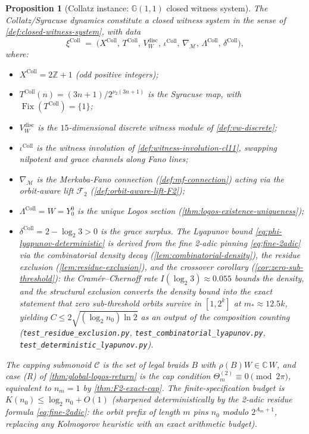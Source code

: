 \documentclass[11pt,a4paper]{article}
\theoremstyle{plain}
\newtheorem{proposition}[theorem]{Proposition}
\theoremstyle{definition}
\theoremstyle{remark}
\numberwithin{equation}{section}
\newcommand{\Cl}{\mathbb{G}}
\newcommand{\Complex}{\mathbb{C}}
\newcommand{\Z}{\mathbb{Z}}
\DeclareMathOperator{\Fix}{Fix}
\begin{document}
\begin{proposition}[Collatz instance: $\Cl(1,1)$ closed witness system]
\label{prop:collatz-closed-witness-system}
The Collatz/Syracuse dynamics constitute a closed witness system
in the sense of \cref{def:closed-witness-system}, with data
\[
  \xi^{\text{Coll}}\;=\;\bigl(
    X^{\text{Coll}},\,T^{\text{Coll}},\,V_W^{\mathrm{disc}},\,
    \iota^{\text{Coll}},\,\nabla_{\mathcal{M}},\,
    \Lambda^{\text{Coll}},\,\delta^{\text{Coll}}
  \bigr),
\]
where:
\begin{itemize}
  \item $X^{\text{Coll}}=2\Z+1$ (odd positive integers);
  \item $T^{\text{Coll}}(n)=(3n+1)/2^{\nu_2(3n+1)}$ is the
        Syracuse map, with $\Fix(T^{\text{Coll}})=\{1\}$;
  \item $V_W^{\mathrm{disc}}$ is the $15$-dimensional discrete
        witness module of \cref{def:vw-discrete};
  \item $\iota^{\text{Coll}}$ is the witness involution of
        \cref{def:witness-involution-cl11}, swapping nilpotent
        and grace channels along Fano lines;
  \item $\nabla_{\mathcal{M}}$ is the Merkaba-Fano connection
        (\cref{def:mf-connection}) acting via the orbit-aware
        lift $\mathcal{F}_2$ (\cref{def:orbit-aware-lift-F2});
  \item $\Lambda^{\text{Coll}}=W=Y_0^0$ is the unique Logos
        section (\cref{thm:logos-existence-uniqueness});
  \item $\delta^{\text{Coll}}=2-\log_2 3>0$ is the grace surplus.
        The Lyapunov bound
        \eqref{eq:phi-lyapunov-deterministic} is \emph{derived}
        from the fine 2-adic pinning \eqref{eq:fine-2adic} via
        the combinatorial density decay
        (\cref{lem:combinatorial-density}), the residue exclusion
        (\cref{lem:residue-exclusion}), and the crossover corollary
        (\cref{cor:zero-sub-threshold}): the Cram\'er--Chernoff
        rate $I(\log_2 3)\approx 0.055$ bounds the density, and
        the structural exclusion converts the density bound into
        the exact statement that zero sub-threshold orbits survive
        in $[1,2^k]$ at $m_*\approx 12.5k$,
        yielding $C\le 2\sqrt{(\log_2 n_0)\ln 2}$ as an output
        of the composition counting
        (\texttt{test\_residue\_exclusion.py},
        \texttt{test\_combinatorial\_lyapunov.py},
        \texttt{test\_deterministic\_lyapunov.py}).
\end{itemize}
The capping submonoid $\mathcal{C}$ is the set of legal braids
$B$ with $\rho(B)W\in\Complex\,W$, and case (R) of
\cref{thm:global-logos-return} is the cap condition
$\Theta_m^{(2)}\equiv 0\pmod{2\pi}$, equivalent to $n_m=1$
by \cref{thm:F2-exact-cap}.  The finite-specification budget is
$K(n_0)\le\log_2 n_0+O(1)$ (sharpened deterministically by the
2-adic residue formula \eqref{eq:fine-2adic}: the orbit prefix
of length $m$ pins $n_0$ modulo $2^{A_m+1}$, replacing any
Kolmogorov heuristic with an exact arithmetic budget).
\end{proposition}
\end{document}

